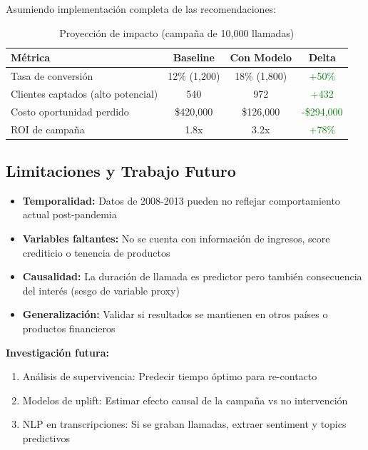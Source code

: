 \documentclass[12pt,letterpaper]{article}
\begin{document}
Asumiendo implementación completa de las recomendaciones:

\begin{table}[H]
\centering
\caption{Proyección de impacto (campaña de 10,000 llamadas)}
\label{tab:impacto_proyectado}
\begin{tabular}{@{}lccc@{}}
\toprule
\textbf{Métrica} & \textbf{Baseline} & \textbf{Con Modelo} & \textbf{Delta} \\
\midrule
Tasa de conversión & 12\% (1,200) & 18\% (1,800) & \textcolor{green}{+50\%} \\
Clientes captados (alto potencial) & 540 & 972 & \textcolor{green}{+432} \\
Costo oportunidad perdido & \$420,000 & \$126,000 & \textcolor{green}{-\$294,000} \\
ROI de campaña & 1.8x & 3.2x & \textcolor{green}{+78\%} \\
\bottomrule
\end{tabular}
\end{table}

\subsection{Limitaciones y Trabajo Futuro}

\begin{itemize}
    \item \textbf{Temporalidad:} Datos de 2008-2013 pueden no reflejar comportamiento actual post-pandemia
    \item \textbf{Variables faltantes:} No se cuenta con información de ingresos, score crediticio o tenencia de productos
    \item \textbf{Causalidad:} La duración de llamada es predictor pero también consecuencia del interés (sesgo de variable proxy)
    \item \textbf{Generalización:} Validar si resultados se mantienen en otros países o productos financieros
\end{itemize}

\textbf{Investigación futura:}
\begin{enumerate}
    \item Análisis de supervivencia: Predecir tiempo óptimo para re-contacto
    \item Modelos de uplift: Estimar efecto causal de la campaña vs no intervención
    \item NLP en transcripciones: Si se graban llamadas, extraer sentiment y topics predictivos
\end{enumerate}
\end{document}
